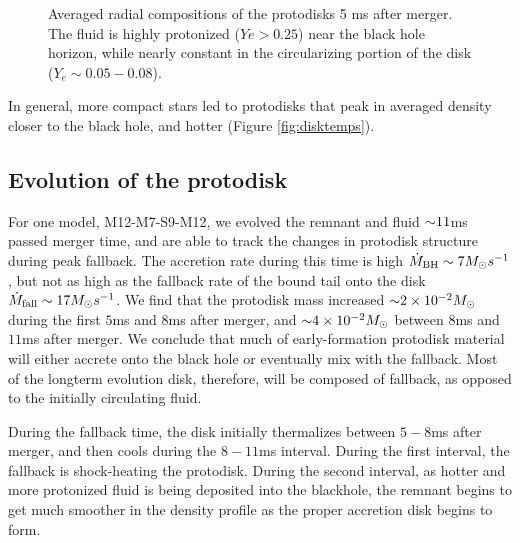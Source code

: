 \begin{figure}
	\centering
	
	\caption[Radial compositions of the protodisks 5 ms after merger]{
	Averaged radial compositions of the protodisks 5 ms after merger.  
	The fluid is highly protonized ($Ye > 0.25$) near the black hole horizon, while nearly constant in the circularizing portion of the disk ($Y_e \sim 0.05 - 0.08$).
	}
	\label{fig:diskYes}
\end{figure}

%	

In general, more compact stars led to protodisks that peak in averaged density closer to the black hole, and hotter (Figure \ref{fig:disktemps}).

\subsection{Evolution of the protodisk}

For one model, M12-M7-S9-M12, we evolved the remnant and fluid $\mathord{\sim} 11$ms passed merger time, and are able to track the changes in protodisk structure during peak fallback.
The accretion rate during this time is high $\dot{M}_{\rm BH} \sim 7 M_\odot s^{-1}$, but not as high as the fallback rate of the bound tail onto the disk $\dot{M}_{\rm fall} \sim 17 M_\odot s^{-1}$.
We find that the protodisk mass increased $\mathord{\sim} 2 \times 10^{-2} M_\odot$ during the first $5$ms and $8$ms after merger, and $\mathord{\sim}4 \times 10^{-2} M_\odot$ between $8$ms and $11$ms after merger.
We conclude that much of early-formation protodisk material will either accrete onto the black hole or eventually mix with the fallback.
Most of the longterm evolution disk, therefore, will be composed of fallback, as opposed to the initially circulating fluid.

During the fallback time, the disk initially thermalizes between $5-8$ms after merger, and then cools during the $8-11$ms interval. 
During the first interval, the fallback is shock-heating the protodisk.
During the second interval, 
as hotter and more protonized fluid is being deposited into the blackhole,
the remnant begins to get much smoother in the density profile as the proper accretion disk begins to form.



